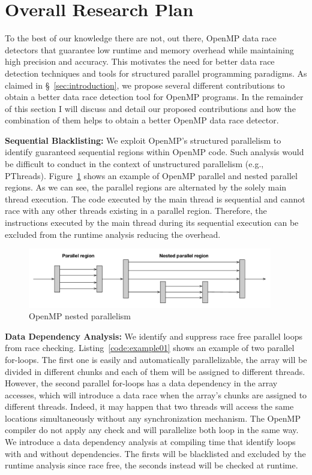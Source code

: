 \section{Overall Research Plan}
\label{sec:overallresearchplan}

To the best of our knowledge there are not, out there, OpenMP data race
detectors that guarantee low runtime and memory overhead while maintaining
high precision and accuracy.
%
This motivates the need for better data race detection techniques and tools
for structured parallel programming paradigms.
%
As claimed in \S~\ref{sec:introduction}, we propose several different
contributions to obtain a better data race detection tool for OpenMP programs.
%
In the remainder of this section I will discuss and detail our proposed
contributions and how the combination of them helps to obtain a better OpenMP
data race detector.

\textbf{Sequential Blacklisting:} We exploit OpenMP's structured parallelism
to identify guaranteed sequential regions within OpenMP code.
%
Such analysis would be difficult to conduct in the context of unstructured
parallelism (e.g., PThreads).
%
Figure~\ref{fig:nested} shows an example of OpenMP parallel and nested
parallel regions.
%
As we can see, the parallel regions are alternated by the solely main thread
execution.
%
The code executed by the main thread is sequential and cannot race with any
other threads existing in a parallel region.
%
Therefore, the instructions executed by the main thread during its sequential
execution can be excluded from the runtime analysis reducing the overhead.

\begin{figure}
  \centering
  \includegraphics[width=0.95\textwidth]{figures/nested_parallelism}
  \caption{OpenMP nested parallelism}
  \label{fig:nested}
\end{figure}

\textbf{Data Dependency Analysis:} We identify and suppress race free parallel
loops from race checking.
%
Listing~\ref{code:example01} shows an example of two parallel for-loops.
%
The first one is easily and automatically parallelizable, the array will be
divided in different chunks and each of them will be assigned to different
threads.
%
However, the second parallel for-loops has a data dependency in the array
accesses, which will introduce a data race when the array's chunks are
assigned to different threads.
%
Indeed, it may happen that two threads will access the same locations
simultaneously without any synchronization mechanism.
%
The OpenMP compiler do not apply any check and will parallelize both loop in
the same way.
%
We introduce a data dependency analysis at compiling time that identify loops
with and without dependencies.
%
The firsts will be blacklisted and excluded by the runtime analysis since race
free, the seconds instead will be checked at runtime.

